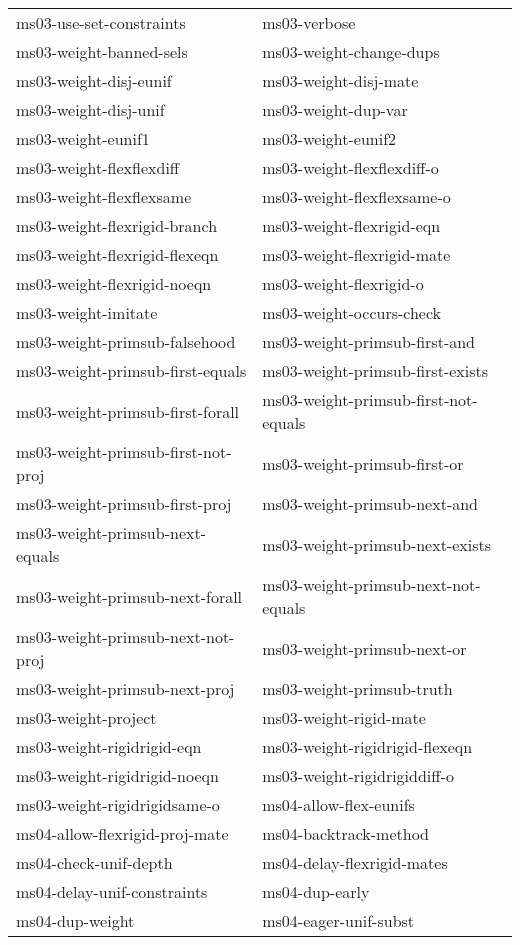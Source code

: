\begin{description}
\begin{tabular}{l l}
ms03-use-set-constraints&ms03-verbose\\
ms03-weight-banned-sels&ms03-weight-change-dups\\
ms03-weight-disj-eunif&ms03-weight-disj-mate\\
ms03-weight-disj-unif&ms03-weight-dup-var\\
ms03-weight-eunif1&ms03-weight-eunif2\\
ms03-weight-flexflexdiff&ms03-weight-flexflexdiff-o\\
ms03-weight-flexflexsame&ms03-weight-flexflexsame-o\\
ms03-weight-flexrigid-branch&ms03-weight-flexrigid-eqn\\
ms03-weight-flexrigid-flexeqn&ms03-weight-flexrigid-mate\\
ms03-weight-flexrigid-noeqn&ms03-weight-flexrigid-o\\
ms03-weight-imitate&ms03-weight-occurs-check\\
ms03-weight-primsub-falsehood&ms03-weight-primsub-first-and\\
ms03-weight-primsub-first-equals&ms03-weight-primsub-first-exists\\
ms03-weight-primsub-first-forall&ms03-weight-primsub-first-not-equals\\
ms03-weight-primsub-first-not-proj&ms03-weight-primsub-first-or\\
ms03-weight-primsub-first-proj&ms03-weight-primsub-next-and\\
ms03-weight-primsub-next-equals&ms03-weight-primsub-next-exists\\
ms03-weight-primsub-next-forall&ms03-weight-primsub-next-not-equals\\
ms03-weight-primsub-next-not-proj&ms03-weight-primsub-next-or\\
ms03-weight-primsub-next-proj&ms03-weight-primsub-truth\\
ms03-weight-project&ms03-weight-rigid-mate\\
ms03-weight-rigidrigid-eqn&ms03-weight-rigidrigid-flexeqn\\
ms03-weight-rigidrigid-noeqn&ms03-weight-rigidrigiddiff-o\\
ms03-weight-rigidrigidsame-o&ms04-allow-flex-eunifs\\
ms04-allow-flexrigid-proj-mate&ms04-backtrack-method\\
ms04-check-unif-depth&ms04-delay-flexrigid-mates\\
ms04-delay-unif-constraints&ms04-dup-early\\
ms04-dup-weight&ms04-eager-unif-subst\\

\end{tabular}
\end{description}
